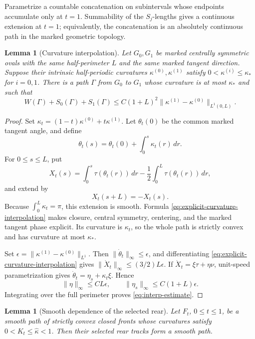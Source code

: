 \documentclass[11pt]{article}
\newtheorem{lemma}[theorem]{Lemma}
\theoremstyle{remark}
\newcommand{\norm}[1]{\lVert #1\rVert}
\begin{document}
Parametrize a countable concatenation on subintervals whose endpoints
accumulate only at \(t=1\).  Summability of the \(S_j\)-lengths
gives a continuous extension at \(t=1\); equivalently, the concatenation is an
absolutely continuous path in the marked geometric topology.

\begin{lemma}[Curvature interpolation]\label{lem:curv-interp}
Let \(G_0,G_1\) be marked centrally symmetric ovals with the same
half-perimeter \(L\) and the same marked tangent direction.  Suppose their
intrinsic half-periodic curvatures \(\kappa^{(0)},\kappa^{(1)}\) satisfy
\(0<\kappa^{(i)}\leq\kappa_*\) for \(i=0,1\).  There is a path
\(\Gamma\) from \(G_0\) to \(G_1\) whose curvature is at most
\(\kappa_*\) and such that
\begin{equation}\label{eq:interp-estimate}
  W(\Gamma)+S_0(\Gamma)+S_1(\Gamma)
  \leq C(1+L)^2
  \norm{\kappa^{(1)}-\kappa^{(0)}}_{L^1(0,L)}.
\end{equation}
\end{lemma}

\begin{proof}
Set \(\kappa_t=(1-t)\kappa^{(0)}+t\kappa^{(1)}\).  Let \(\theta_t(0)\) be the
common marked tangent angle, and define
\[
   \theta_t(s)=\theta_t(0)+\int_0^s\kappa_t(r)\,dr.
\]
For \(0\leq s\leq L\), put
\begin{equation}\label{eq:explicit-curvature-interpolation}
 X_t(s)=\int_0^s\tau(\theta_t(r))\,dr
       -\frac12\int_0^L\tau(\theta_t(r))\,dr,
\end{equation}
and extend by
\[
   X_t(s+L)=-X_t(s).
\]
Because \(\int_0^L\kappa_t=\pi\), this extension is smooth.  Formula
\eqref{eq:explicit-curvature-interpolation} makes closure, central symmetry,
centering, and the marked tangent phase explicit.  Its curvature is
\(\kappa_t\), so the whole path is strictly convex and has curvature at most
\(\kappa_*\).

Set \(\epsilon=\norm{\kappa^{(1)}-\kappa^{(0)}}_{L^1}\).  Then
\(\norm{\dot\theta_t}_\infty\leq\epsilon\), and differentiating
\eqref{eq:explicit-curvature-interpolation} gives
\(\norm{\dot X_t}_\infty\leq(3/2)L\epsilon\).  If
\(\dot X_t=\xi\tau+\eta\nu\), unit-speed parametrization gives
\(\dot\theta_t=\eta_s+\kappa_t\xi\).  Hence
\[
  \norm{\eta}_\infty\leq C L\epsilon,
  \qquad
  \norm{\eta_s}_\infty\leq C(1+L)\epsilon.
\]
Integrating over the full perimeter proves \eqref{eq:interp-estimate}.
\end{proof}

\begin{lemma}[Smooth dependence of the selected rear]\label{lem:path-inverse}
Let \(F_t\), \(0\leq t\leq1\), be a smooth path of strictly convex closed
fronts whose curvatures satisfy \(0<K_t\leq\widehat\kappa<1\).  Then their
selected rear tracks form a smooth path.
\end{lemma}
\end{document}
